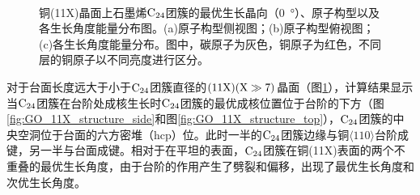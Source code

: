 \begin{figure}[htb]
    \centering
    \\[-0.5ex]
    \caption{铜(11X)晶面上石墨烯$\rm{C_{24}}$团簇的最优生长晶向（\SI{0}{\degree}）、原子构型以及各生长角度能量分布图。(a)原子构型侧视图；(b)原子构型俯视图；(c)各生长角度能量分布。图中，碳原子为灰色，铜原子为红色，不同层的铜原子以不同亮度进行区分。}
    \label{fig:GO_C24_11X}
\end{figure}

对于台面长度远大于小于$\rm{C_{24}}$团簇直径的$\rm (11X)(X \gg 7 )$晶面（图\ref{fig:GO_C24_11X}），计算结果显示当$\rm{C_{24}}$团簇在台阶处成核生长时$\rm{C_{24}}$团簇的最优成核位置位于台阶的下方（图\ref{fig:GO_11X_structure_side}和图\ref{fig:GO_11X_structure_top}），$\rm{C_{24}}$团簇的中央空洞位于台面的六方密堆（hcp）位。此时一半的$\rm{C_{24}}$团簇边缘与铜$\langle 110\rangle$台阶成键，另一半与台面成键。相对于在平坦的表面，$\rm{C_{24}}$团簇在铜(11X)表面的两个不重叠的最优生长角度，由于台阶的作用产生了劈裂和偏移，出现了最优生长角度和次优生长角度。

